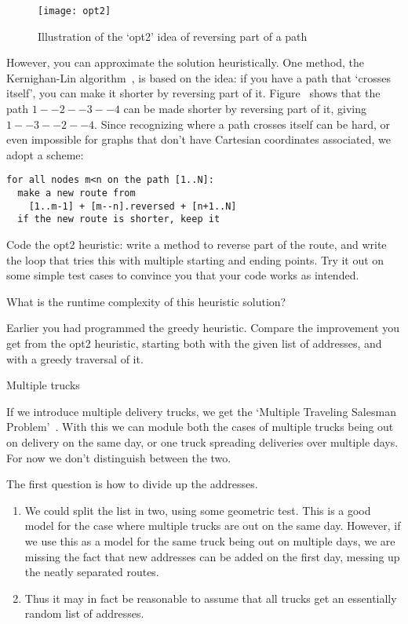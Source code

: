 \begin{figure}[ht]
  \texttt{[image: opt2]}
  \caption{Illustration of the `opt2' idea of reversing part of a
    path}
  \label{fig:opt2}
\end{figure}

However, you can approximate the solution heuristically. One method,
the Kernighan-Lin algorithm~\cite{KL:TSP}, is based on the
 idea: if you have a path that `crosses itself', you
can make it shorter by reversing part of it. Figure~
shows that the path $1--2--3--4$ can be made shorter by reversing part
of it, giving $1--3--2--4$. Since recognizing where a path crosses
itself can be hard, or even impossible for graphs that don't have
Cartesian coordinates associated, we adopt a scheme:
\begin{verbatim}
for all nodes m<n on the path [1..N]:
  make a new route from
    [1..m-1] + [m--n].reversed + [n+1..N]
  if the new route is shorter, keep it
\end{verbatim}

\begin{exercise}
  Code the opt2 heuristic: write a method to reverse part of the
  route, and write the loop that tries this with multiple starting and
  ending points. Try it out on some simple test cases to convince you
  that your code works as intended.
\end{exercise}

\begin{exercise}
  What is the runtime complexity of this heuristic solution?
\end{exercise}

\begin{exercise}
  Earlier you had programmed the greedy heuristic. Compare the
  improvement you get from the opt2 heuristic, starting both with the
  given list of addresses, and with a greedy traversal of it.
\end{exercise}

 {Multiple trucks}
\label{sec:amazon-days}

If we introduce multiple delivery trucks, we get the `Multiple
Traveling Salesman Problem'~\cite{Bektas:MTSP}.
With this we can module both the cases of multiple trucks being out on
delivery on the same day, or one truck spreading deliveries over
multiple days. For now we don't distinguish between the two.

The first question is how to divide up the addresses.
\begin{enumerate}
\item We could split the list in two, using some geometric test. This
  is a good model for the case where multiple trucks are out on the
  same day. However, if we use this as a model for the same truck
  being out on multiple days, we are missing the fact that new
  addresses can be added on the first day, messing up the neatly
  separated routes.
\item Thus it may in fact be reasonable to assume that all trucks get
  an essentially random list of addresses.
\end{enumerate}

